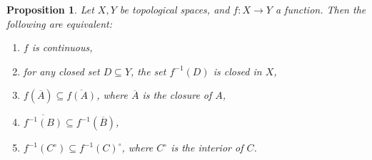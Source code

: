 \documentclass[12pt]{article}
\newtheorem{prop}{Proposition}
\begin{document}
\begin{prop} Let $X,Y$ be topological spaces, and $f:X\to Y$ a function.  Then the following are equivalent: 
\begin{enumerate}
\item $f$ is continuous,
\item for any closed set $D\subseteq Y$, the set $f^{-1}(D)$ is closed in $X$,
\item $f(\overline{A})\subseteq \overline{f(A)}$, where $\overline{A}$ is the closure of $A$,
\item $\overline{f^{-1}(B)} \subseteq f^{-1}(\overline{B})$,
\item $f^{-1}(C^{\circ}) \subseteq f^{-1}(C)^{\circ}$, where $C^{\circ}$ is the interior of $C$.
\end{enumerate}
\end{prop}
\end{document}
